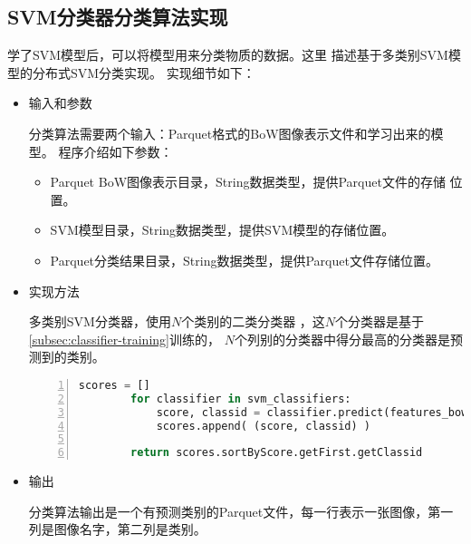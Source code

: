 \subsection{SVM分类器分类算法实现}
\label{subsec:classifier-label}
学了SVM模型后，可以将模型用来分类物质的数据。这里
描述基于多类别SVM模型的分布式SVM分类实现。
实现细节如下：
\begin{itemize}
  \item 输入和参数

        分类算法需要两个输入：Parquet格式的BoW图像表示文件和学习出来的模型。
        程序介绍如下参数：
        \begin{itemize}
            \item Parquet BoW图像表示目录，String数据类型，提供Parquet文件的存储
                  位置。
            \item SVM模型目录，String数据类型，提供SVM模型的存储位置。
            \item Parquet分类结果目录，String数据类型，提供Parquet文件存储位置。
        \end{itemize}

  \item 实现方法

        多类别SVM分类器，使用$N$个类别的二类分类器
        ，这$N$个分类器是基于\ref{subsec:classifier-training}训练的，
        $N$个列别的分类器中得分最高的分类器是预测到的类别。
        \begin{lstlisting}[language=Python,
                           basicstyle=\small,
                           numbers=left,
                           showstringspaces=false,
                           caption={SVM多类别分类器分类pseudocode},
                           label={lst:classifier-training}]
        scores = []
        for classifier in svm_classifiers:
            score, classid = classifier.predict(features_bow)
            scores.append( (score, classid) )

        return scores.sortByScore.getFirst.getClassid

        \end{lstlisting}


  \item 输出

        分类算法输出是一个有预测类别的Parquet文件，每一行表示一张图像，第一列是图像名字，第二列是类别。
\end{itemize}





